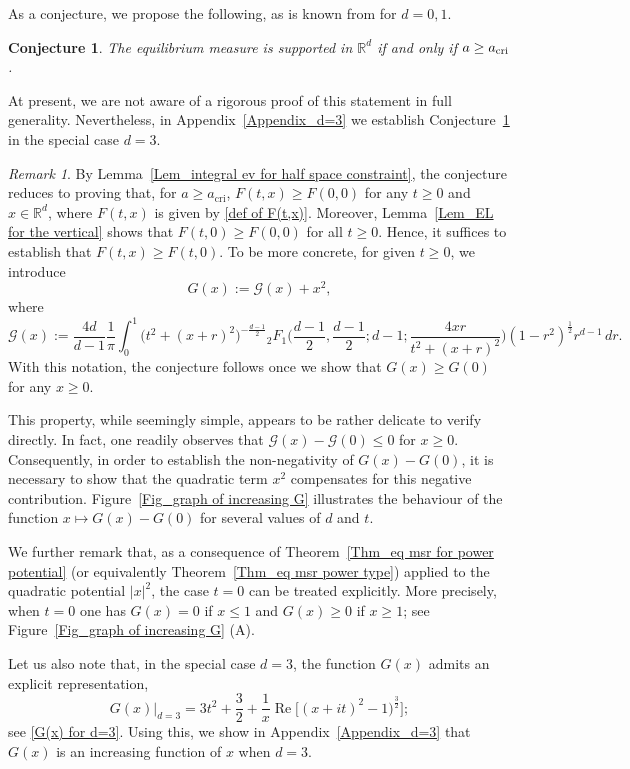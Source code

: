 \documentclass[10pt]{amsart}
\def\R{\mathbb{R}}
\newcommand{\re}{\operatorname{Re}}
\theoremstyle{plain}
\newtheorem{conj}[thm]{Conjecture}
\theoremstyle{remark}
\newtheorem{rem}{Remark}
\numberwithin{equation}{section}
\begin{document}
As a conjecture, we propose the following, as is known from
\cite{ASZ14,DKMSS17} for $d=0,1$.

\begin{conj}\label{Cj1}
The equilibrium measure is supported in $\R^d$ if and only if $a \ge a_{ \rm cri }$.  
\end{conj}

At present, we are not aware of a rigorous proof of this statement in full
generality. Nevertheless, in Appendix~\ref{Appendix_d=3} we establish
Conjecture~\ref{Cj1} in the special case \( d=3 \).
 
     
 
 
 
\begin{rem} \label{Rem_conjecture inequality}
By Lemma~\ref{Lem_integral ev for half space constraint}, the conjecture reduces to proving that, for $a \ge a_{\mathrm{cri}}$, $F(t,x)\ge F(0,0)$ for any $t \ge 0$ and $x \in \R^d$, where $F(t,x)$ is given by \eqref{def of F(t,x)}. 
Moreover, Lemma~\ref{Lem_EL for the vertical} shows that $F(t,0) \ge F(0,0)$ for all $t \ge 0$. Hence, it suffices to establish that $F(t,x) \ge F(t,0)$.  
To be more concrete, for given $t \ge 0$, we introduce
\begin{equation} \label{def of G(x)}
G(x):= \mathcal{G}(x) + x^2 , 
\end{equation} 
where 
\begin{equation}
\mathcal{G}(x):= \frac{4d}{d-1} \frac{1}{\pi}  \int_0^1 \Big( t^2+(x+r)^2  \Big)^{ -\frac{d-1}{2} } {}_2F_1\Big( \frac{d-1}{2}, \frac{d-1}{2}; d-1;  \frac{ 4 x r }{ t^2+( x+r )^2 }\Big) (1-r^2)^{\frac12} r^{d-1}\,dr. 
\end{equation}
With this notation, the conjecture follows once we show that $G(x) \ge G(0)$ for any $x \ge 0$. 

This property, while seemingly simple, appears to be rather delicate to verify directly.
In fact, one readily observes that $\mathcal{G}(x)-\mathcal{G}(0) \le 0$ for $x \ge 0$. Consequently, in order to establish the non-negativity of $G(x)-G(0)$, it is necessary to show that the quadratic term $x^2$ compensates for this negative contribution. Figure~\ref{Fig_graph of increasing G} illustrates the behaviour of the function $x \mapsto G(x)-G(0)$ for several values of $d$ and $t$.

We further remark that, as a consequence of
Theorem~\ref{Thm_eq msr for power potential} (or equivalently
Theorem~\ref{Thm_eq msr power type}) applied to the quadratic potential $|x|^2$, the case $t=0$ can be treated explicitly.
More precisely, when $t=0$ one has $G(x)=0$ if $x\le 1$ and $G(x) \ge 0$ if $x \ge 1$; see Figure~\ref{Fig_graph of increasing G} (A).  

Let us also note that, in the special case \( d=3 \), the function \( G(x) \)
admits an explicit representation,
\begin{equation}
G(x)|_{d=3} = 3t^2+\frac32 + \frac{1}{x}  \re \Big[(x+it)^2-1)^{\frac32}\Big] ; 
\end{equation}
see \eqref{G(x) for d=3}. Using this, we show in
Appendix~\ref{Appendix_d=3} that \( G(x) \) is an increasing function of \( x \) when \( d=3 \).
\end{rem} 
\end{document}
